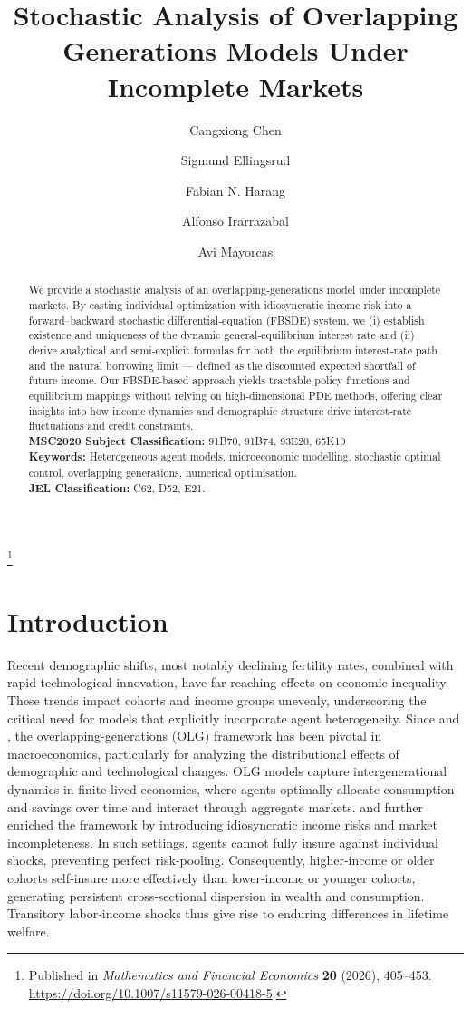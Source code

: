 \documentclass[11pt,oneside,english,reqno,dvipsnames,table]{amsart}
\title{Stochastic Analysis of Overlapping Generations Models Under Incomplete Markets}
\author{Cangxiong Chen \and Sigmund Ellingsrud \and Fabian N. Harang \and Alfonso Irarrazabal \and Avi Mayorcas }
\numberwithin{equation}{section}
\theoremstyle{plain}
\theoremstyle{definition}
\theoremstyle{remark}
\theoremstyle{plain}
\theoremstyle{plain}
\theoremstyle{plain}
\theoremstyle{plain}
\theoremstyle{plain}
\theoremstyle{plain}
\theoremstyle{plain}
\numberwithin{thm}{section}
\begin{document}
\begin{abstract}
  We provide a stochastic analysis of an overlapping‐generations model under incomplete markets. By casting individual optimization with idiosyncratic income risk into a forward–backward stochastic differential‐equation (FBSDE) system, we (i) establish existence and uniqueness of the dynamic general‐equilibrium interest rate and (ii) derive analytical and semi‐explicit formulas for both the equilibrium interest‐rate path and the natural borrowing limit — defined as the discounted expected shortfall of future income. Our FBSDE‐based approach yields tractable policy functions and equilibrium mappings without relying on high‐dimensional PDE methods, offering clear insights into how income dynamics and demographic structure drive interest‐rate fluctuations and credit constraints.\\[1ex]
   
\textbf{MSC2020 Subject Classification:} 91B70, 91B74, 93E20, 65K10 \\[1ex]
	\textbf{Keywords:} Heterogeneous agent models, microeconomic modelling, stochastic optimal control, overlapping generations, numerical optimisation. \\[1ex]
\textbf{JEL Classification:} C62, D52, E21.
\end{abstract}



\thanks{Published in \emph{Mathematics and Financial Economics} \textbf{20} (2026), 405--453. \url{https://doi.org/10.1007/s11579-026-00418-5}.}

\maketitle
\tableofcontents


\section{Introduction}

Recent demographic shifts, most notably declining fertility rates, combined with rapid technological innovation, have far-reaching effects on economic inequality. These trends impact cohorts and income groups unevenly, underscoring the critical need for models that explicitly incorporate agent heterogeneity.
Since \cite{samuelson1958} and \cite{diamond1965}, the overlapping-generations (OLG) framework has been pivotal in macroeconomics, particularly for analyzing the distributional effects of demographic and technological changes. OLG models capture intergenerational dynamics in finite-lived economies, where agents optimally allocate consumption and savings over time and interact through aggregate markets.
\cite{riosrull1996_OLG} and \cite{huggett1996_OLG} further enriched the framework by introducing idiosyncratic income risks and market incompleteness. In such settings, agents cannot fully insure against individual shocks, preventing perfect risk‐pooling. Consequently, higher‐income or older cohorts self‐insure more effectively than lower‐income or younger cohorts, generating persistent cross‐sectional dispersion in wealth and consumption. Transitory labor‐income shocks thus give rise to enduring differences in lifetime welfare.
\end{document}
